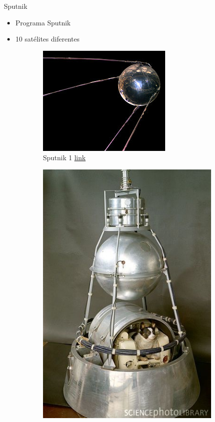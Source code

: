 

\begin{frame}[fragile]{Sputnik}
\vspace{10px}
\pause
{}
\begin{block}{}
	\begin{itemize}
		\item Programa Sputnik
		\pause
		\item 10 satélites diferentes
	\end{itemize}
\end{block}
\begin{figure}
		\centering
		\pause
		\begin{subfigure}{0.33\textwidth}
			\centering
			\includegraphics[scale=1.3]{./EtapaPrimeriza/imagenes/s1.jpg}
			\caption{Sputnik 1 \href{https://es.wikipedia.org/wiki/Sputnik\_1\#/media/File:Sputnik\_asm.jpg}{link}}
		\end{subfigure}
		\pause
		\begin{subfigure}{0.33\textwidth}
			\centering
			\includegraphics[scale=1.0]{./EtapaPrimeriza/imagenes/s2.jpg}

\end{subfigure}
\end{figure}
\end{frame}
